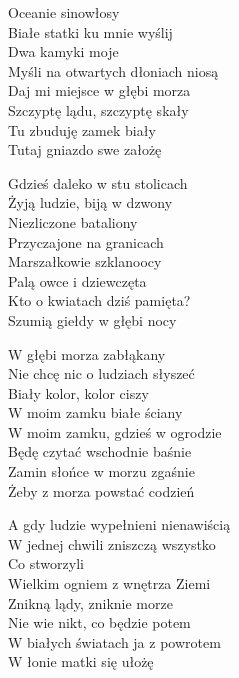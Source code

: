 \begin{text}
    Oceanie sinowłosy\\
    Białe statki ku mnie wyślij\\
    Dwa kamyki moje\\
    Myśli na otwartych dłoniach niosą\\
    Daj mi miejsce w głębi morza\\
    Szczyptę lądu, szczyptę skały\\
    Tu zbuduję zamek biały\\
    Tutaj gniazdo swe założę

    Gdzieś daleko w stu stolicach\\
    Żyją ludzie, biją w dzwony\\
    Niezliczone bataliony\\
    Przyczajone na granicach\\
    Marszałkowie szklanoocy\\
    Palą owce i dziewczęta\\
    Kto o kwiatach dziś pamięta?\\
    Szumią giełdy w głębi nocy

    W głębi morza zabłąkany\\
    Nie chcę nic o ludziach słyszeć\\
    Biały kolor, kolor ciszy\\
    W moim zamku białe ściany\\
    W moim zamku, gdzieś w ogrodzie\\
    Będę czytać wschodnie baśnie\\
    Zamin słońce w morzu zgaśnie\\
    Żeby z morza powstać codzień

    A gdy ludzie wypełnieni nienawiścią\\
    W jednej chwili zniszczą wszystko\\
    Co stworzyli\\
    Wielkim ogniem z wnętrza Ziemi\\
    Znikną lądy, zniknie morze\\
    Nie wie nikt, co będzie potem\\
    W białych światach ja z powrotem\\
    W łonie matki się ułożę
\end{text}
\begin{chord}

\end{chord}